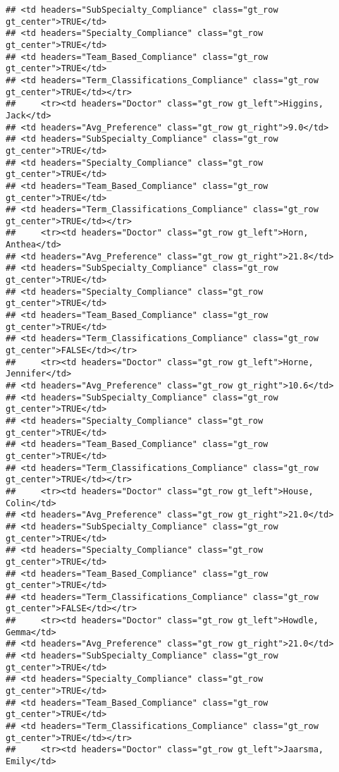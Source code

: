 \documentclass[
]{article}
\begin{document}
\begin{verbatim}
## <td headers="SubSpecialty_Compliance" class="gt_row gt_center">TRUE</td>
## <td headers="Specialty_Compliance" class="gt_row gt_center">TRUE</td>
## <td headers="Team_Based_Compliance" class="gt_row gt_center">TRUE</td>
## <td headers="Term_Classifications_Compliance" class="gt_row gt_center">TRUE</td></tr>
##     <tr><td headers="Doctor" class="gt_row gt_left">Higgins, Jack</td>
## <td headers="Avg_Preference" class="gt_row gt_right">9.0</td>
## <td headers="SubSpecialty_Compliance" class="gt_row gt_center">TRUE</td>
## <td headers="Specialty_Compliance" class="gt_row gt_center">TRUE</td>
## <td headers="Team_Based_Compliance" class="gt_row gt_center">TRUE</td>
## <td headers="Term_Classifications_Compliance" class="gt_row gt_center">TRUE</td></tr>
##     <tr><td headers="Doctor" class="gt_row gt_left">Horn, Anthea</td>
## <td headers="Avg_Preference" class="gt_row gt_right">21.8</td>
## <td headers="SubSpecialty_Compliance" class="gt_row gt_center">TRUE</td>
## <td headers="Specialty_Compliance" class="gt_row gt_center">TRUE</td>
## <td headers="Team_Based_Compliance" class="gt_row gt_center">TRUE</td>
## <td headers="Term_Classifications_Compliance" class="gt_row gt_center">FALSE</td></tr>
##     <tr><td headers="Doctor" class="gt_row gt_left">Horne, Jennifer</td>
## <td headers="Avg_Preference" class="gt_row gt_right">10.6</td>
## <td headers="SubSpecialty_Compliance" class="gt_row gt_center">TRUE</td>
## <td headers="Specialty_Compliance" class="gt_row gt_center">TRUE</td>
## <td headers="Team_Based_Compliance" class="gt_row gt_center">TRUE</td>
## <td headers="Term_Classifications_Compliance" class="gt_row gt_center">TRUE</td></tr>
##     <tr><td headers="Doctor" class="gt_row gt_left">House, Colin</td>
## <td headers="Avg_Preference" class="gt_row gt_right">21.0</td>
## <td headers="SubSpecialty_Compliance" class="gt_row gt_center">TRUE</td>
## <td headers="Specialty_Compliance" class="gt_row gt_center">TRUE</td>
## <td headers="Team_Based_Compliance" class="gt_row gt_center">TRUE</td>
## <td headers="Term_Classifications_Compliance" class="gt_row gt_center">FALSE</td></tr>
##     <tr><td headers="Doctor" class="gt_row gt_left">Howdle, Gemma</td>
## <td headers="Avg_Preference" class="gt_row gt_right">21.0</td>
## <td headers="SubSpecialty_Compliance" class="gt_row gt_center">TRUE</td>
## <td headers="Specialty_Compliance" class="gt_row gt_center">TRUE</td>
## <td headers="Team_Based_Compliance" class="gt_row gt_center">TRUE</td>
## <td headers="Term_Classifications_Compliance" class="gt_row gt_center">TRUE</td></tr>
##     <tr><td headers="Doctor" class="gt_row gt_left">Jaarsma, Emily</td>

\end{verbatim}
\end{document}
